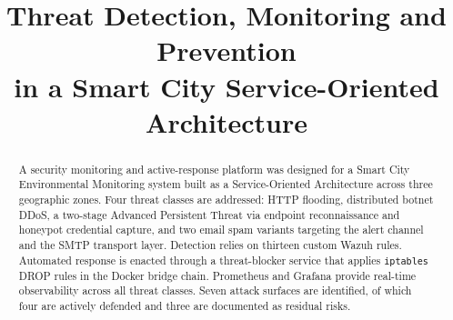 \documentclass[conference]{IEEEtran}
\begin{document}
\title{Threat Detection, Monitoring and Prevention\\in a Smart City Service-Oriented Architecture}

\author{%
}

\maketitle

\begin{abstract}
A security monitoring and active-response platform was designed for a Smart City
Environmental Monitoring system built as a Service-Oriented Architecture across three
geographic zones. Four threat classes are addressed: HTTP flooding, distributed botnet
DDoS, a two-stage Advanced Persistent Threat via endpoint reconnaissance and honeypot
credential capture, and two email spam variants targeting the alert channel and the
SMTP transport layer. Detection relies on thirteen custom Wazuh rules. Automated
response is enacted through a threat-blocker service that applies \texttt{iptables}
DROP rules in the Docker bridge chain. Prometheus and Grafana provide real-time
observability across all threat classes. Seven attack surfaces are identified, of which
four are actively defended and three are documented as residual risks.
\end{abstract}












\end{document}
